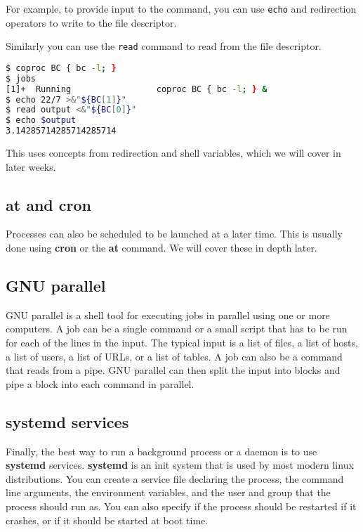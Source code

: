 For example, to provide input to the command, you can use \lstinline|echo| and
redirection operators to write to the file descriptor.

Similarly you can use the \lstinline|read| command to read from the file descriptor.

\begin{lstlisting}[language=bash]
$ coproc BC { bc -l; }
$ jobs
[1]+  Running                 coproc BC { bc -l; } &
$ echo 22/7 >&"${BC[1]}"
$ read output <&"${BC[0]}"
$ echo $output
3.14285714285714285714
\end{lstlisting}

This uses concepts from redirection and shell variables, which we will cover
in later weeks.

\subsection{at and cron}

Processes can also be scheduled to be launched at a later time.
This is usually done using \textbf{cron} or the \textbf{at} command.
We will cover these in depth later.

\subsection{GNU parallel}

GNU parallel is a shell tool for executing jobs in parallel using one
or more computers. A job can be a single command or a small script that
has to be run for each of the lines in the input. The typical input is
a list of files, a list of hosts, a list of users, a list of URLs, or a
list of tables. A job can also be a command that reads from a pipe.
GNU parallel can then split the input into blocks and pipe a block
into each command in parallel.

\subsection{systemd services}

Finally, the best way to run a background process or a daemon is to use
\textbf{systemd} services. \textbf{systemd} is an init system that is
used by most modern linux distributions. You can create a service file
declaring the process, the command line arguments, the environment variables,
and the user and group that the process should run as. You can also
specify if the process should be restarted if it crashes, or if it should
be started at boot time.


